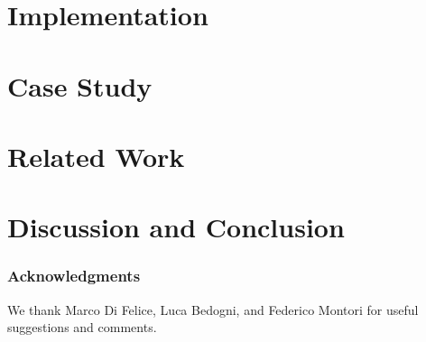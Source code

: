 \documentclass[lnbip]{svmultln}
\begin{document}
\section{Implementation}
\label{sub:implementation}


\section{Case Study}
\label{sub:case}


\section{Related Work}
\label{sec:related}


\section{Discussion and Conclusion}
\label{conclusion}


\subsubsection*{Acknowledgments} %
We thank Marco Di Felice, Luca Bedogni, and Federico Montori for useful
suggestions and comments.




{}
\end{document}
